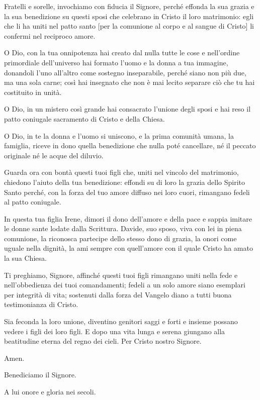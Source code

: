 	\begin{dialoghi}
		\item[\sacerdote] Fratelli e sorelle, invochiamo con fiducia il Signore, perché effonda la sua grazia e la sua benedizione su questi sposi che celebrano in Cristo il loro matrimonio: egli che li ha uniti nel patto santo [per la comunione al corpo e al sangue di Cristo] li confermi nel reciproco amore.

		O Dio, con la tua onnipotenza hai creato dal nulla tutte le cose e nell'ordine primordiale dell'universo hai formato l'uomo e la donna a tua immagine, donandoli l'uno all'altro come sostegno inseparabile, perché siano non più due, ma una sola carne; così hai insegnato che non è mai lecito separare ciò che tu hai costituito in unità.

		O Dio, in un mistero così grande hai consacrato l'unione degli sposi e hai reso il patto coniugale sacramento di Cristo e della Chiesa.

		O Dio, in te la donna e l'uomo si uniscono, e la prima comunità umana, la famiglia, riceve in dono quella benedizione che nulla poté cancellare, né il peccato originale né le acque del diluvio.

		Guarda ora con bontà questi tuoi figli che, uniti nel vincolo del matrimonio, chiedono l'aiuto della tua benedizione: effondi su di loro la grazia dello Spirito Santo perché, con la forza del tuo amore diffuso nei loro cuori, rimangano fedeli al patto coniugale.

		In questa tua figlia Irene, dimori il dono dell'amore e della pace e sappia imitare le donne sante lodate dalla Scrittura. Davide, suo sposo, viva con lei in piena comunione, la riconosca partecipe dello stesso dono di grazia, la onori come uguale nella dignità, la ami sempre con quell'amore con il quale Cristo ha amato la sua Chiesa.

		Ti preghiamo, Signore, affinché questi tuoi figli rimangano uniti nella fede e nell'obbedienza dei tuoi comandamenti; fedeli a un solo amore siano esemplari per integrità di vita; sostenuti dalla forza del Vangelo diano a tutti buona testimonianza di Cristo.

		Sia feconda la loro unione, diventino genitori saggi e forti e insieme possano vedere i figli dei loro figli. E dopo una vita lunga e serena giungano alla beatitudine eterna del regno dei cieli. Per Cristo nostro Signore.
		\item[\assemblea] Amen.
		\item[\sacerdote] Benediciamo il Signore.
		\item[\assemblea] A lui onore e gloria nei secoli.
	\end{dialoghi}

